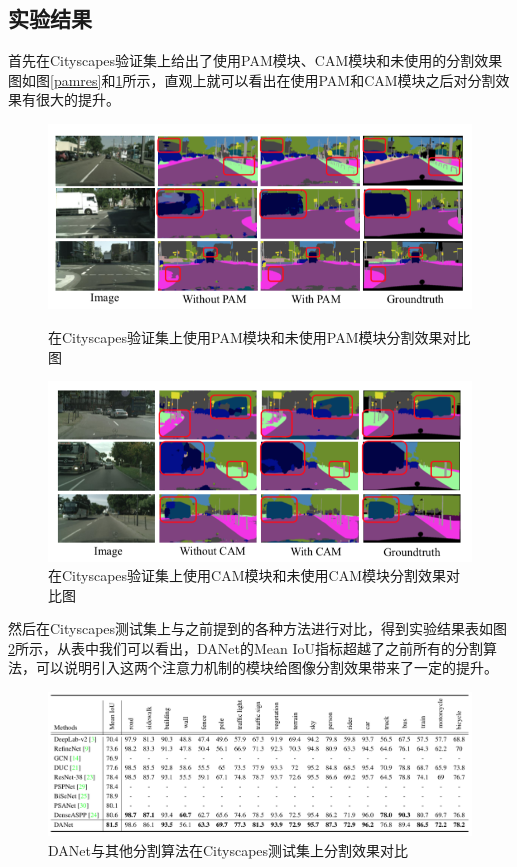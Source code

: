 \documentclass[cn]{elegantbook}
\begin{document}
\subsection{实验结果}
首先在Cityscapes验证集上给出了使用PAM模块、CAM模块和未使用的分割效果图如图\ref{pamres}和\ref{camres}所示，直观上就可以看出在使用PAM和CAM模块之后对分割效果有很大的提升。
\begin{figure}[!h]
	\centering
	\begin{minipage}[t]{0.48\textwidth}
		\centering
		\includegraphics[width=\textwidth]{images/pamres}
		\caption{\label{pamres}在Cityscapes验证集上使用PAM模块和未使用PAM模块分割效果对比图}
	\end{minipage}
	\begin{minipage}[t]{0.48\textwidth}
		\centering
		\includegraphics[width=\textwidth]{images/camres}
		\caption{\label{camres}在Cityscapes验证集上使用CAM模块和未使用CAM模块分割效果对比图}
	\end{minipage}
\end{figure}

然后在Cityscapes测试集上与之前提到的各种方法进行对比，得到实验结果表如图\ref{DANetres}所示，从表中我们可以看出，DANet的Mean IoU指标超越了之前所有的分割算法，可以说明引入这两个注意力机制的模块给图像分割效果带来了一定的提升。
\begin{figure}[!h]
	\centering
	\includegraphics[width=\textwidth]{images/DANetres}
	\caption{\label{DANetres}DANet与其他分割算法在Cityscapes测试集上分割效果对比}
\end{figure}
\end{document}
